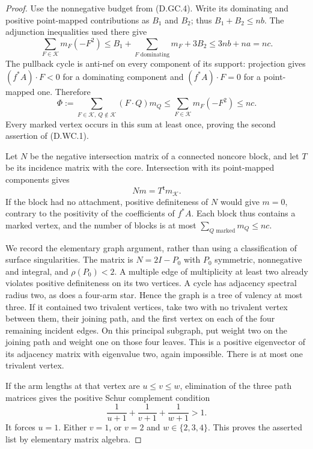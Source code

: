 \begin{proof}
Use the nonnegative budget from (D.GC.4).  Write its dominating
and positive point-mapped contributions as $B_1$ and $B_2$;
thus $B_1+B_2\le nb$.  The adjunction inequalities used there
give
\[
 \sum_{F\in\mathcal K}m_F(-F^2)
 \le B_1+\sum_{F\text{ dominating}}m_F+3B_2
 \le3nb+na=nc.                                      \tag{D.WC.3}
\]
The pullback cycle is anti-nef on every component of its support:
projection gives $(f^*A)\cdot F<0$ for a dominating component and
$(f^*A)\cdot F=0$ for a point-mapped one.  Therefore
\[
 \Phi:=\sum_{F\in\mathcal K,\ Q\notin\mathcal K}
                         (F\cdot Q)m_Q
 \le\sum_{F\in\mathcal K}m_F(-F^2)\le nc.           \tag{D.WC.4}
\]
Every marked vertex occurs in this sum at least once, proving
the second assertion of (D.WC.1).

Let $N$ be the negative intersection matrix of a connected
noncore block, and let $T$ be its incidence matrix with the core.
Intersection with its point-mapped components gives
\[
                           N m=T^{\mathsf t}m_{\mathcal K}.
\]
If the block had no attachment, positive definiteness of $N$
would give $m=0$, contrary to the positivity of the coefficients
of $f^*A$.  Each block thus contains a marked vertex, and the
number of blocks is at most $\sum_{Q\text{ marked}}m_Q\le nc$.

We record the elementary graph argument, rather than using a
classification of surface singularities.  The matrix is $N=2I-P_0$
with $P_0$ symmetric, nonnegative and integral, and
$\rho(P_0)<2$.  A multiple edge of multiplicity at least two
already violates positive definiteness on its two vertices.
A cycle has adjacency spectral radius two, as does a four-arm
star.  Hence the graph is a tree of valency at most three.
If it contained two trivalent vertices, take two with no
trivalent vertex between them, their joining path, and the
first vertex on each of the four remaining incident edges.
On this principal subgraph, put weight two on the joining path
and weight one on those four leaves.  This is a positive
eigenvector of its adjacency matrix with eigenvalue two,
again impossible.  There is at most one trivalent vertex.

If the arm lengths at that vertex are $u\le v\le w$, elimination
of the three path matrices gives the positive Schur complement
condition
\[
                 \frac1{u+1}+\frac1{v+1}+\frac1{w+1}>1.
                                                               \tag{D.WC.5}
\]
It forces $u=1$.  Either $v=1$, or $v=2$ and $w\in\{2,3,4\}$.
This proves the asserted list by elementary matrix algebra.


\end{proof}

